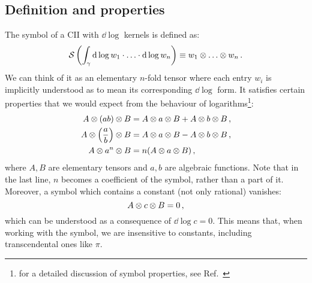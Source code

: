 \documentclass[main.tex]{subfiles}
\begin{document}
\subsection{Definition and properties}
The symbol of a CII with $\dd \log$ kernels is defined as:
\begin{equation} \label{eq:symboldef}
    \mathcal{S} \left(\int_\gamma \mathrm{d} \log w_1 \cdot \ldots \cdot \mathrm{d} \log w_n \right) \equiv w_1 \otimes \ldots \otimes w_n \,.
\end{equation}
We can think of it as an elementary $n$-fold tensor where each entry $w_i$ is implicitly understood as to mean its corresponding $\dd \log$ form. It satisfies certain properties that we would expect from the behaviour of logarithms\footnote{for a detailed discussion of symbol properties, see Ref.~\cite{Duhr:2011zq}}:
\begin{subequations}
\begin{align} \label{eq:symbolproperties}
    A \otimes (ab) \otimes B &= A \otimes a \otimes B + A \otimes b \otimes B\,, \\
    A \otimes \left(\frac{a}{b}\right) \otimes B &= A \otimes a \otimes B - A \otimes b \otimes B\,, \\
    A \otimes a^n \otimes B &= n(A \otimes a \otimes B)\,,
\end{align}
\end{subequations}
where $A, B$ are elementary tensors and $a, b$ are algebraic functions. Note that in the last line, $n$ becomes a coefficient of the symbol, rather than a part of it. Moreover, a symbol which contains a constant (not only rational) vanishes:
\begin{equation} \label{eq:symbolAcB}
    A \otimes c \otimes B = 0\,,
\end{equation}
which can be understood as a consequence of $\dd \log c = 0$. This means that, when working with the symbol, we are insensitive to constants, including transcendental ones like $\pi$. 
\end{document}
